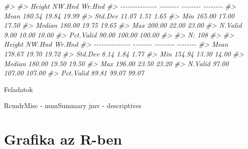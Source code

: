 \documentclass[
]{book}
\newenvironment{Shaded}{\begin{snugshade}}{\end{snugshade}}
\newcommand{\CommentTok}[1]{\textcolor[rgb]{0.56,0.35,0.01}{\textit{#1}}}
\begin{document}
\begin{Shaded}
\begin{Highlighting}[]
\CommentTok{\#\textgreater{} }
\CommentTok{\#\textgreater{}                   Height   NW.Hnd   Wr.Hnd}
\CommentTok{\#\textgreater{} {-}{-}{-}{-}{-}{-}{-}{-}{-}{-}{-}{-}{-}{-}{-} {-}{-}{-}{-}{-}{-}{-}{-} {-}{-}{-}{-}{-}{-}{-}{-} {-}{-}{-}{-}{-}{-}{-}{-}}
\CommentTok{\#\textgreater{}            Mean   180.54    19.84    19.99}
\CommentTok{\#\textgreater{}         Std.Dev    11.07     1.51     1.65}
\CommentTok{\#\textgreater{}             Min   165.00    17.00    17.50}
\CommentTok{\#\textgreater{}          Median   180.00    19.75    19.65}
\CommentTok{\#\textgreater{}             Max   200.00    22.00    23.00}
\CommentTok{\#\textgreater{}         N.Valid     9.00    10.00    10.00}
\CommentTok{\#\textgreater{}       Pct.Valid    90.00   100.00   100.00}
\CommentTok{\#\textgreater{} }
\CommentTok{\#\textgreater{} N: 108  }
\CommentTok{\#\textgreater{} }
\CommentTok{\#\textgreater{}                   Height   NW.Hnd   Wr.Hnd}
\CommentTok{\#\textgreater{} {-}{-}{-}{-}{-}{-}{-}{-}{-}{-}{-}{-}{-}{-}{-} {-}{-}{-}{-}{-}{-}{-}{-} {-}{-}{-}{-}{-}{-}{-}{-} {-}{-}{-}{-}{-}{-}{-}{-}}
\CommentTok{\#\textgreater{}            Mean   178.67    19.70    19.72}
\CommentTok{\#\textgreater{}         Std.Dev     8.14     1.84     1.77}
\CommentTok{\#\textgreater{}             Min   154.94    13.30    14.00}
\CommentTok{\#\textgreater{}          Median   180.00    19.50    19.50}
\CommentTok{\#\textgreater{}             Max   196.00    23.50    23.20}
\CommentTok{\#\textgreater{}         N.Valid    97.00   107.00   107.00}
\CommentTok{\#\textgreater{}       Pct.Valid    89.81    99.07    99.07}
\end{Highlighting}
\end{Shaded}

Feladatok

RcmdrMisc - numSummary
jmv - descriptives

\hypertarget{grafika-az-r-ben}{%
\chapter{Grafika az R-ben}\label{grafika-az-r-ben}}
\end{document}
